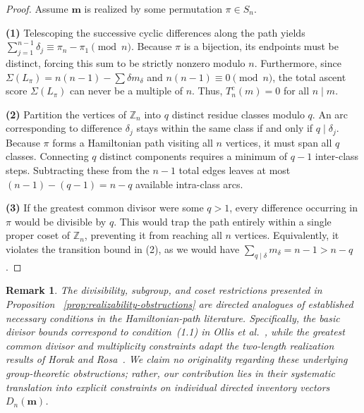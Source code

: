 \documentclass[11pt,a4paper]{amsart}
\newtheorem{remark}[theorem]{Remark}
\newcommand{\1}{\mathbf{1}}
\begin{document}
\begin{proof}
Assume $\bm{m}$ is realized by some permutation $\pi \in S_n$.

\noindent \textbf{(1)} Telescoping the successive cyclic differences along the path yields $\sum_{j=1}^{n-1} \delta_j \equiv \pi_n - \pi_1 \pmod n$. Because $\pi$ is a bijection, its endpoints must be distinct, forcing this sum to be strictly nonzero modulo $n$. Furthermore, since $\Sigma(L_\pi) = n(n-1) - \sum \delta m_\delta$ and $n(n-1) \equiv 0 \pmod n$, the total ascent score $\Sigma(L_\pi)$ can never be a multiple of $n$. Thus, $T_n^c(m) = 0$ for all $n \mid m$.

\noindent \textbf{(2)} Partition the vertices of $\mathbb{Z}_n$ into $q$ distinct residue classes modulo $q$. An arc corresponding to difference $\delta_j$ stays within the same class if and only if $q \mid \delta_j$. Because $\pi$ forms a Hamiltonian path visiting all $n$ vertices, it must span all $q$ classes. Connecting $q$ distinct components requires a minimum of $q-1$ inter-class steps. Subtracting these from the $n-1$ total edges leaves at most $(n-1) - (q-1) = n-q$ available intra-class arcs.

\noindent \textbf{(3)} If the greatest common divisor were some $q > 1$, every difference occurring in $\pi$ would be divisible by $q$. This would trap the path entirely within a single proper coset of $\mathbb{Z}_n$, preventing it from reaching all $n$ vertices. Equivalently, it violates the transition bound in (2), as we would have $\sum_{q \mid \delta} m_\delta = n-1 > n-q$.
\end{proof}
\begin{remark}\label{remark:obstructions-provenance}
The divisibility, subgroup, and coset restrictions presented in Proposition ~\ref{prop:realizability-obstructions} are directed analogues of established necessary conditions in the Hamiltonian-path literature. Specifically, the basic divisor bounds correspond to condition~(1.1) in Ollis et al.~\cite{OllisPasottiPellegriniSchmitt2021}, while the greatest common divisor and multiplicity constraints adapt the two-length realization results of Horak and Rosa~\cite[Theorem~4.1]{HorakRosa2009}. We claim no originality regarding these underlying group-theoretic obstructions; rather, our contribution lies in their systematic translation into explicit constraints on individual directed inventory vectors $D_n(\mathbf{m})$.
\end{remark}
\end{document}
